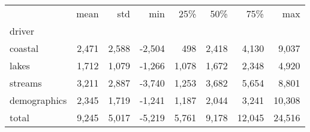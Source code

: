 \begin{tabular}{lrrrrrrr}
\toprule
 & mean & std & min & 25\% & 50\% & 75\% & max \\
driver &  &  &  &  &  &  &  \\
\midrule
coastal & 2,471 & 2,588 & -2,504 & 498 & 2,418 & 4,130 & 9,037 \\
lakes & 1,712 & 1,079 & -1,266 & 1,078 & 1,672 & 2,348 & 4,920 \\
streams & 3,211 & 2,887 & -3,740 & 1,253 & 3,682 & 5,654 & 8,801 \\
demographics & 2,345 & 1,719 & -1,241 & 1,187 & 2,044 & 3,241 & 10,308 \\
total & 9,245 & 5,017 & -5,219 & 5,761 & 9,178 & 12,045 & 24,516 \\
\bottomrule
\end{tabular}
